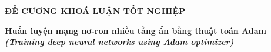 \documentclass{article}[14pt]
\begin{document}
    \begin{figure}[h]
        \begin{floatrow}
        {%
    
        }
        {%
    
        }
        \end{floatrow}
    \end{figure}
    
    \begin{center}
        
        \textbf{\Large ĐỀ CƯƠNG KHOÁ LUẬN TỐT NGHIỆP} \\ 
    \end{center}
    
    
    \begin{center}
        
        \textbf{\huge Huấn luyện mạng nơ-ron nhiều tầng ẩn bằng thuật toán Adam} 
        \\
        
    \vspace{.5cm}
        \textit{\textbf{\Large (Training deep neural networks using Adam optimizer)}}
    \end{center}
    
\end{document}
